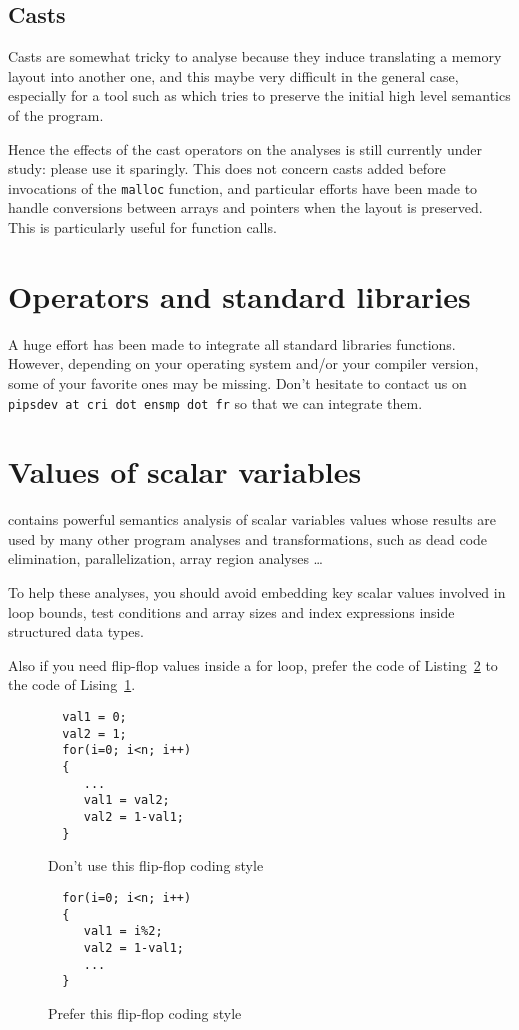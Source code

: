 \documentclass[a4paper]{article}
\begin{document}
\subsection{Casts}
\label{sec:casts}

Casts are somewhat tricky to analyse because they induce translating a
memory layout into another one, and this maybe very difficult in the
general case, especially for a tool such as \Apips which tries to
preserve the initial high level semantics of the program.

Hence the effects of the cast operators on the analyses is still
currently under study: please use it sparingly. This does not concern
casts added before invocations of the \texttt{malloc} function, and
particular efforts have been made to handle conversions between arrays
and pointers when the layout is preserved. This is particularly useful
for function calls.


\section{Operators and standard libraries}
\label{sec:operators_and_standard_libraries}

A huge effort has been made to integrate all standard libraries
functions. However, depending on your operating system and/or your
compiler version, some of your favorite ones may be missing. Don't
hesitate to contact us on \texttt{pipsdev at cri dot ensmp dot fr} so
that we can integrate them.


\section{Values of scalar variables}
\label{sec:values_of_scalar_variables}

\Apips contains powerful semantics analysis of scalar variables values
whose results are used by many other program analyses and
transformations, such as dead code elimination, parallelization,
array region analyses \ldots

To help these analyses, you should avoid embedding key scalar values
involved in loop bounds, test conditions and array sizes and index
expressions inside structured data types.

Also if you need flip-flop values inside a for loop, prefer the code
of Listing~\ref{fig:good_flip_flop} to the code of
Lising~\ref{fig:bad_flip_flop}.

  \begin{figure}
    \begin{lstlisting}
  val1 = 0;
  val2 = 1;
  for(i=0; i<n; i++)
  {
     ...
     val1 = val2;
     val2 = 1-val1;
  }
    \end{lstlisting}
    \caption{Don't use this flip-flop coding style}
    \label{fig:bad_flip_flop}
  \end{figure}
  \begin{figure}
    \begin{lstlisting}
  for(i=0; i<n; i++)
  {
     val1 = i%2;
     val2 = 1-val1;
     ...
  }
    \end{lstlisting}
    \caption{Prefer this flip-flop coding style}
    \label{fig:good_flip_flop}
  \end{figure}
\end{document}
